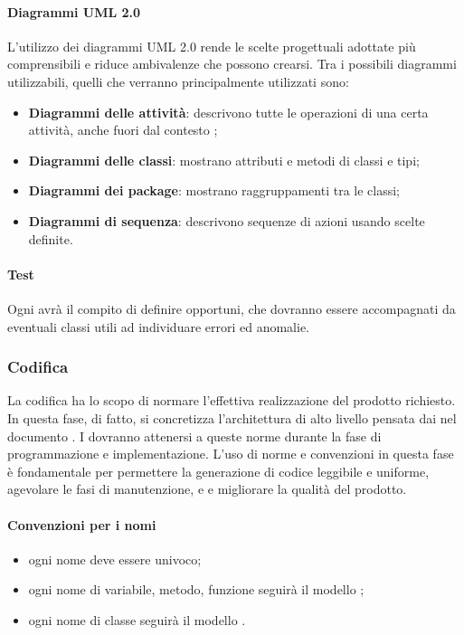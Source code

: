 \paragraph{Diagrammi UML 2.0}
L'utilizzo dei diagrammi UML 2.0 rende le scelte progettuali adottate più comprensibili e riduce ambivalenze che possono crearsi. Tra i possibili diagrammi utilizzabili, quelli che verranno principalmente utilizzati sono:
\begin{itemize}
\item \textbf{Diagrammi delle attività}: descrivono tutte le operazioni di una certa attività, anche fuori dal contesto ;
\item \textbf{Diagrammi delle classi}: mostrano attributi e metodi di classi e tipi;
\item \textbf{Diagrammi dei package}: mostrano raggruppamenti tra le classi;
\item \textbf{Diagrammi di sequenza}: descrivono sequenze di azioni usando scelte definite.
\end{itemize}
\paragraph{Test}
Ogni \prog{} avrà il compito di definire  opportuni, che dovranno essere accompagnati da eventuali classi utili ad individuare errori ed anomalie.
\subsubsection{Codifica}
La codifica ha lo scopo di normare l'effettiva realizzazione del prodotto  richiesto. In questa fase, di fatto, si concretizza l'architettura di alto livello pensata dai \progs{} nel documento \PdQ{}. I \progrs{} dovranno attenersi a queste norme durante la fase di programmazione e implementazione. L'uso di norme e convenzioni in questa fase è fondamentale per permettere la generazione di codice leggibile e uniforme, agevolare le fasi di manutenzione,  e  e migliorare la qualità del prodotto.
\paragraph{Convenzioni per i nomi}
\begin{itemize}
	\item ogni nome deve essere univoco;
	\item ogni nome di variabile, metodo, funzione seguirà il modello ;
	\item ogni nome di classe seguirà il modello .
\end{itemize}
\newpage
